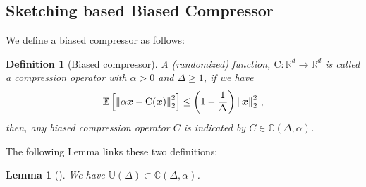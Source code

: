 \documentclass[twoside]{article}
\newtheorem{theorem}{Theorem}
\newtheorem{lemma}{Lemma}
\newtheorem{definition}{Definition}
\begin{document}




\vspace{-0.05in}
\subsection{Sketching based Biased Compressor}
\vspace{-0.05in}


We define a biased compressor as follows:
\begin{definition}[Biased compressor]
A (randomized) function,  ${\text{C}}:\mathbb{R}^{d}\rightarrow\mathbb{R}^{d}$ is called a compression operator with $\alpha>0$ and $\Delta\geq 1$, if we have 
\begin{align}\notag
    \mathbb{E}\left[\left\|\alpha\boldsymbol{x}-{\text{C}}(\boldsymbol{x})\right\|^2_2\right]\leq \left(1-\frac{1}{\Delta}\right)\left\|\boldsymbol{x}\right\|^2_2\, ,
\end{align}
then, any biased compression operator $C$ is indicated by $C\in \mathbb{C}(\Delta,\alpha)$. 
\end{definition}
The following Lemma links these two definitions:
\begin{lemma}[\cite{horvath2020better}]
We have $\mathbb{U}(\Delta)\subset\mathbb{C}(\Delta, \alpha)$.
\end{lemma}
\end{document}
